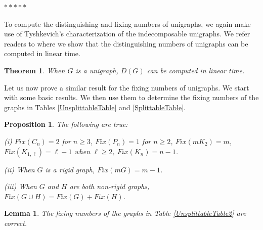 \documentclass[11pt]{article}
\newtheorem{theorem}[df]{Theorem}
\newtheorem{lemma}[df]{Lemma}
\newtheorem{proposition}[df]{Proposition}
\begin{document}
\medskip	
\bigskip %
\centerline{$*  *  *  * *$}
\bigskip %
\medskip


To compute the distinguishing and fixing numbers of unigraphs,  we again make use of Tyshkevich's characterization of the indecomposable unigraphs.  We refer readers to \cite{Ch25} where we show that  the distinguishing numbers of unigraphs can be computed in linear time.   %


\begin{theorem}
{\bf \cite{Ch25}}
When $G$ is a unigraph, $D(G)$ can be computed in linear time.
\end{theorem}

Let us now prove a similar result for the fixing numbers of unigraphs.   We start with some basic results. We then use them to determine the fixing numbers of the graphs in Tables \ref{UnsplittableTable} and \ref{SplittableTable}.



\begin{proposition}
\label{propbasic}
The following are true: 

\noindent (i) $Fix(C_n) = 2$ for $n \ge 3$, $Fix(P_n) = 1$ for $n \ge 2$,  $Fix(mK_2) = m$, $Fix(K_{1, \ell}) = \ell - 1$ when $\ell \ge 2$, $Fix(K_n) = n-1$. 

\noindent (ii) When $G$ is a rigid graph, $Fix(mG) = m-1$. 

\noindent (iii) When $G$ and $H$ are both non-rigid graphs, $Fix(G \cup H) = Fix(G) + Fix(H)$.
\end{proposition}

\smallskip
\begin{lemma}
The fixing numbers of the graphs  in Table \ref{UnsplittableTable2} are correct. 
\end{lemma}
\end{document}
